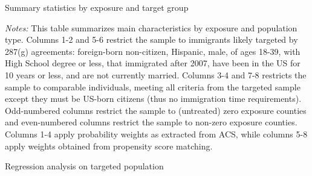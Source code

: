 \documentclass{article}
\begin{document}
\newpage
\begin{landscape}
\begin{table}[h]

\caption{Summary statistics by exposure and target group}
\label{tab:sumstat}
\end{table}

\justifying
\begin{spacing}{1}
\begin{footnotesize}
\noindent \textit{Notes:} This table summarizes main characteristics by exposure and population type. Columns 1-2 and 5-6 restrict the sample to immigrants likely targeted by 287(g) agreements: foreign-born non-citizen, Hispanic, male, of ages 18-39, with High School degree or less, that immigrated after 2007, have been in the US for 10 years or less, and are not currently married. Columns 3-4 and 7-8 restricts the sample to comparable individuals, meeting all criteria from the targeted sample except they must be US-born citizens (thus no immigration time requirements). Odd-numbered columns restrict the sample to (untreated) zero exposure counties and even-numbered columns restrict the sample to non-zero exposure counties. Columns 1-4 apply probability weights as extracted from ACS, while columns 5-8 apply weights obtained from propensity score matching.
\end{footnotesize}
\end{spacing}
\end{landscape}




\newpage
\begin{table}[h]

\caption{Regression analysis on targeted population}
\label{tab:sumstat}
\end{table}
\end{document}
